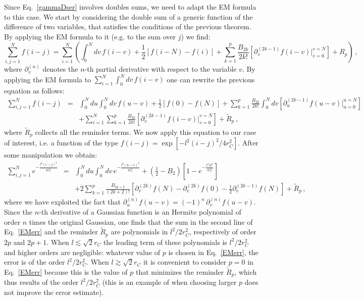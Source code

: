 \documentclass[11pt,onecolumn,amssymb,nofootinbib]{revtex4}
\newcommand\beq{\begin{equation}}
\newcommand\eeq{\end{equation}}
\newcommand\beqa{\begin{eqnarray}}
\newcommand\eeqa{\end{eqnarray}}
\begin{document}
Since Eq.~\eqref{gammaDser} involves doubles sums, we need to adapt  the EM formula to this case. We start by considering the double sum of a generic function of the difference of two variables, that satisfies the conditions of the previous theorem. By applying the EM formula to it (e.g. to the sum over $j$) we find:
\beq
\sum_{i,j=1}^Nf(i-j)=\sum_{i=1}^N\left(\int_0^Ndv\, f(i-v)+\frac{1}{2}\left[f(i-N)-f(i)\right]+\sum_{k=1}^{p}\frac{B_{2k}}{2k!}\left[\partial^{(2k-1)}_v f(i-v)\Big|^{v=N}_{v=0}\right]+R_p\right)\,,
\eeq
where $\partial^{(n)}_v$ denotes the $n$-th partial derivative with respect to the variable $v$. By applying the EM formula to $\sum_{i=1}^N\int_0^Ndv\, f(i-v)$ one can rewrite the previous equation as follows:
\beqa
\sum_{i,j=1}^Nf(i-j)&=&\int_0^Ndu \int_0^Ndv\, f(u-v)+\frac{1}{2}\left[f(0)-f(N)\right]+\sum_{k=1}^{p}\frac{B_{2k}}{2k!}\int_0^Ndv\left[\partial^{(2k-1)}_u f(u-v)\Big|^{u=N}_{u=0}\right]\nonumber\\
&&+\sum_{i=1}^N\sum_{k=1}^{p}\frac{B_{2k}}{2k!}\left[\partial^{(2k-1)}_v f(i-v)\Big|^{v=N}_{v=0}\right]+\tilde{R}_p\,,
\eeqa
where $\tilde{R}_p$ collects all the reminder terms. We now apply this equation to our case of interest, i.e. a function of the type $f(i-j)=\exp[-l^2(i-j)^2/4r_C^2]$. After some manipulation we obtain:
\beqa\label{EMerr}
\sum_{i,j=1}^Ne^{-\frac{l^2(i-j)^2}{4r_C^2}}&=&\int_0^Ndu \int_0^Ndv\, e^{-\frac{l^2(u-v)^2}{4r_C^2}}+\left(\frac{1}{2}-B_2\right)\left[1-e^{-\frac{l^2N^2}{4r_C^2}}\right]\nonumber\\
&&+2\sum_{k=1}^{p}\frac{B_{2k+2}}{(2k+2)!}\left[ \partial^{(2k)}_vf(N)-\partial^{(2k)}_vf(0)-\frac{1}{2}\partial^{(2k-1)}_vf(N)\right]+\tilde{R}_p\,,
\eeqa
where we have exploited the fact that $\partial^{(n)}_u f(u-v)=(-1)^n\,\partial^{(n)}_v f(u-v)$. Since the $n$-th derivative of a Gaussian function is an Hermite polynomial of order $n$ times the original Gaussian, one finds that the sum in the second line of Eq.~\eqref{EMerr} and the reminder $\tilde{R}_p$ are polynomials in $l^2/2r_C^2$, respectively of order $2p$ and $2p+1$. %
When $l\lesssim \sqrt{2}r_C$ the leading term of these polynomials is $l^2/2r_C^2$ %
and higher orders are negligible: whatever value of $p$ is chosen in Eq.~\eqref{EMerr}, the error is of the order $l^2/2r_C^2$. When $l\gtrsim \sqrt{2}r_C$ it is convenient to consider $p=0$ in Eq.~\eqref{EMerr} because this is the value of $p$ that minimizes the reminder $\tilde{R}_p$, which thus results of the order $l^2/2r_C^2$ (this is an example of when choosing larger $p$ does not improve the error estimate). %
\end{document}
